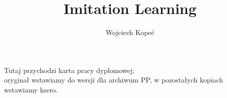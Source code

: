 \documentclass[polish,master,a4paper,oneside]{ppfcmthesis}
\author{%
   Wojciech Kopeć \album{101675} \and
}
\title{Imitation Learning}                   %
\begin{document}
\frontmatter\pagestyle{empty}%
\maketitle\cleardoublepage%

\thispagestyle{empty}\vspace*{\fill}%
\begin{center}Tutaj przychodzi karta pracy dyplomowej;\\oryginał wstawiamy do wersji dla archiwum PP, w pozostałych kopiach wstawiamy ksero.\end{center}%
\vfill\cleardoublepage%

\pagestyle{ppfcmthesis}%
\tableofcontents* \cleardoublepage%

\mainmatter%




\cleardoublepage\appendix%
%
%

{\raggedright\sloppy\small}

\ppcolophon
\end{document}
